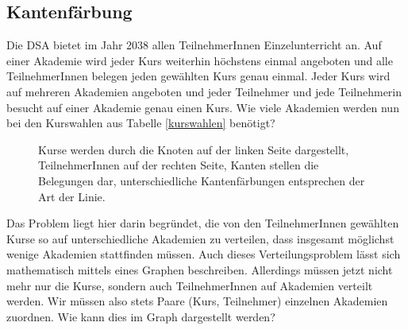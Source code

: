 	\subsection{Kantenfärbung}
	Die DSA bietet im Jahr 2038 allen TeilnehmerInnen Einzelunterricht an. Auf einer Akademie wird jeder Kurs weiterhin höchstens einmal angeboten und alle TeilnehmerInnen belegen jeden gewählten Kurs genau einmal. Jeder Kurs wird auf mehreren Akademien angeboten und jeder Teilnehmer und jede Teilnehmerin besucht auf einer Akademie genau einen Kurs.
 Wie viele Akademien werden nun bei den Kurswahlen aus Tabelle \ref{kurswahlen}  benötigt?
\begin{figure}
\centering
\caption{Kurse werden durch die Knoten auf der linken Seite dargestellt, TeilnehmerInnen auf der rechten Seite, Kanten stellen die Belegungen dar, unterschiedliche Kantenfärbungen entsprechen der Art der Linie.}
\label{problem2}
\end{figure}

Das Problem liegt hier darin begründet,  die von den  TeilnehmerInnen gewählten Kurse so auf unterschiedliche Akademien zu verteilen, dass insgesamt möglichst wenige Akademien stattfinden müssen.
Auch dieses Verteilungsproblem lässt sich mathematisch mittels eines Graphen beschreiben.
Allerdings müssen jetzt nicht mehr nur die Kurse, sondern auch TeilnehmerInnen auf Akademien verteilt werden.
Wir müssen also stets Paare (Kurs, Teilnehmer) einzelnen Akademien zuordnen.
Wie kann dies im Graph dargestellt werden?

